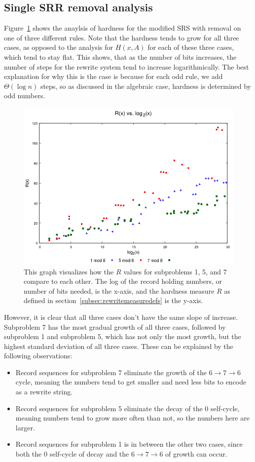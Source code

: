 \subsection{Single SRR removal analysis} \label{subsec:rewritehardness}
Figure~\ref{fig:rvslog} shows the anaylsis of hardness for the modified SRS with removal on one of three different rules. Note that the hardness tends to grow for all three cases, as opposed to the analysis for $H(x,A)$ for each of these three cases, which tend to stay flat. This shows, that as the number of bits increases, the number of steps for the rewrite system tend to increase logarithmically. The best explanation for why this is the case is because for each odd rule, we add $\Theta(\log{n})$ steps, so as discussed in the algebraic case, hardness is determined by odd numbers.
\begin{figure}
    \centering
    \includegraphics[scale=0.75]{ModAvoidanceAnalysisPics/R_vs_log.png}
    \caption{This graph visualizes how the $R$ values for subproblems 1, 5, and 7 compare to each other. The log of the record holding numbers, or number of bits needed, is the x-axis, and the hardness measure $R$ as defined in section~\ref{subsec:rewritemeasuredefs} is the y-axis.}
    \label{fig:rvslog}
\end{figure}
However, it is clear that all three cases don't have the same slope of increase. Subproblem 7 has the most gradual growth of all three cases, followed by subproblem 1 and subproblem 5, which has not only the most growth, but the highest standard deviation of all three cases. These can be explained by the following observations:
\begin{itemize}
    \item Record sequences for subproblem 7 eliminate the growth of the $6 \rightarrow 7 \rightarrow 6$ cycle, meaning the numbers tend to get smaller and need less bits to encode as a rewrite string.
    \item Record sequences for subproblem 5 eliminate the decay of the 0 self-cycle, meaning numbers tend to grow more often than not, so the numbers here are larger.
    \item Record sequences for subproblem 1 is in between the other two cases, since both the 0 self-cycle of decay and the $6 \rightarrow 7 \rightarrow 6$ of growth can occur.
\end{itemize}
